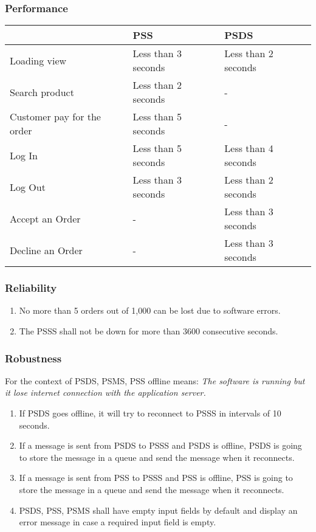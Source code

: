 \subsubsection{Performance}
\begin{center}
    \begin{tabular}{p{}p{}p{}}
    \hline
    \textbf{} & \textbf{PSS} & \textbf{PSDS} \\ 
     \hline
     Loading view & Less than 3 seconds & Less than 2 seconds \\  
     \hline
     Search product & Less than 2 seconds & - \\  
     \hline
     Customer pay for the order & Less than 5 seconds & - \\  
     \hline
     Log In & Less than 5 seconds & Less than 4 seconds \\  
     \hline
     Log Out & Less than 3 seconds & Less than 2 seconds \\  
     \hline
     Accept an Order & - & Less than 3 seconds \\  
     \hline
     Decline an Order & - & Less than 3 seconds \\  
     \hline
    \end{tabular}
\end{center}

\pagebreak

\subsubsection{Reliability}
\begin{enumerate}[label=REL-\arabic*]
    \item No more than 5 orders out of 1,000 can be lost due to software errors.
    \item The PSSS shall not be down for more than 3600 consecutive seconds.
\end{enumerate}

\subsubsection{Robustness}
For the context of PSDS, PSMS, PSS offline means: \textit{The software is 
running but it lose internet connection with the application server.}

\begin{enumerate}[label=ROB-\arabic*]
    \item If PSDS goes offline, it will try to reconnect to PSSS in 
    intervals of 10 seconds.
    \item If a message is sent from PSDS to PSSS and PSDS is offline, PSDS is 
    going to store the message in a queue and send the message 
    when it reconnects.
    \item If a message is sent from PSS to PSSS and PSS is offline, PSS is 
    going to store the message in a queue and send the message 
    when it reconnects.
    \item PSDS, PSS, PSMS shall have empty input fields by default and display 
    an error message in case a required input field is empty.
\end{enumerate}

